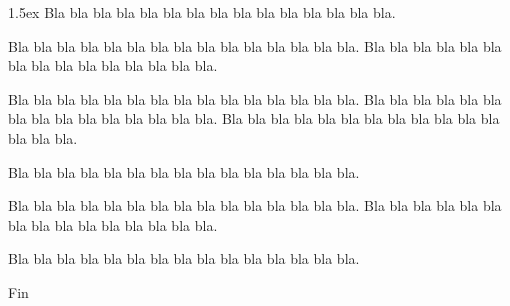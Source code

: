 \documentclass{article}
\makeatletter
\newenvironment{titlebox}[1]{%
		   \fboxrule0.4pt
		   \let\breakboxparindent\z@
		   \def\bkvz@bottom{\hrule\@height\fboxrule}%
		   \let\bkvz@before@breakbox\medbreak
		   \def\bkvz@set@linewidth{\advance\linewidth\dimexpr-2\fboxrule-2\fboxsep}%
		   \def\bkvz@left{\vrule\@width\fboxrule\hskip\fboxsep}%
		   \def\bkvz@right{\hskip\fboxsep\vrule\@width\fboxrule}%
		   \def\bkvz@top{\hbox to \hsize{%
		      \vrule\@width\fboxrule\@height\fboxrule
		      \leaders\hrule\@height\fboxrule\hskip1cm %
		      \begingroup
		         \fboxsep1pt
		         \setbox\z@\hbox{\kern0.5ex #1\kern0.5ex }%
		         \setbox\z@\hbox{\lower\dimexpr(\ht\z@-\dp\z@)/2\hbox{\fbox{\box\z@}}}%
		         \dp\z@\z@\ht\z@\z@\box\z@%
		      \endgroup
		      \leaders\hrule\@height\fboxrule\hskip0pt plus 1fil
		      \vrule\@width\fboxrule\@height\fboxrule}}%
		   \breakbox\kern1.5ex\relax}\endbreakbox
\makeatother
\begin{document}
\begin{titlebox}{Définition}
	Bla bla bla bla bla bla bla bla bla bla bla bla bla bla bla.
	
	Bla bla bla bla bla bla bla bla bla bla bla bla bla bla bla.
	Bla bla bla bla bla bla bla bla bla bla bla bla bla bla bla.
	
	Bla bla bla bla bla bla bla bla bla bla bla bla bla bla bla.
	Bla bla bla bla bla bla bla bla bla bla bla bla bla bla bla.
	Bla bla bla bla bla bla bla bla bla bla bla bla bla bla bla.
	
	Bla bla bla bla bla bla bla bla bla bla bla bla bla bla bla.
	
	Bla bla bla bla bla bla bla bla bla bla bla bla bla bla bla.
	Bla bla bla bla bla bla bla bla bla bla bla bla bla bla bla.
	
	Bla bla bla bla bla bla bla bla bla bla bla bla bla bla bla.
\end{titlebox}

Fin
\end{document}
